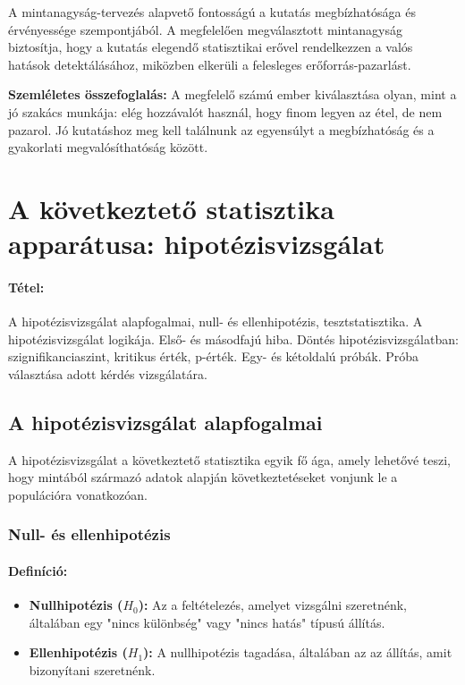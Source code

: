 \documentclass[a4paper,12pt]{article}
\begin{document}
    A mintanagyság-tervezés alapvető fontosságú a kutatás megbízhatósága és érvényessége szempontjából. A megfelelően megválasztott mintanagyság biztosítja, hogy a kutatás elegendő statisztikai erővel rendelkezzen a valós hatások detektálásához, miközben elkerüli a felesleges erőforrás-pazarlást.

    \textbf{Szemléletes összefoglalás:} A megfelelő számú ember kiválasztása olyan, mint a jó szakács munkája: elég hozzávalót használ, hogy finom legyen az étel, de nem pazarol. Jó kutatáshoz meg kell találnunk az egyensúlyt a megbízhatóság és a gyakorlati megvalósíthatóság között.

    \newpage


    \section{A következtető statisztika apparátusa: hipotézisvizsgálat}

    \paragraph{Tétel:}A hipotézisvizsgálat alapfogalmai, null- és ellenhipotézis, tesztstatisztika. A hipotézisvizsgálat
    logikája. Első- és másodfajú hiba. Döntés hipotézisvizsgálatban: szignifikanciaszint, kritikus
    érték, p-érték. Egy- és kétoldalú próbák. Próba választása adott kérdés vizsgálatára.

    \subsection{A hipotézisvizsgálat alapfogalmai}

    A hipotézisvizsgálat a következtető statisztika egyik fő ága, amely lehetővé teszi, hogy mintából származó adatok alapján következtetéseket vonjunk le a populációra vonatkozóan.

    \subsubsection{Null- és ellenhipotézis}

    \paragraph{Definíció:}
    \begin{itemize}
        \item \textbf{Nullhipotézis ($H_0$):} Az a feltételezés, amelyet vizsgálni szeretnénk, általában egy "nincs különbség" vagy "nincs hatás" típusú állítás.
        \item \textbf{Ellenhipotézis ($H_1$):} A nullhipotézis tagadása, általában az az állítás, amit bizonyítani szeretnénk.
    \end{itemize}
\end{document}

